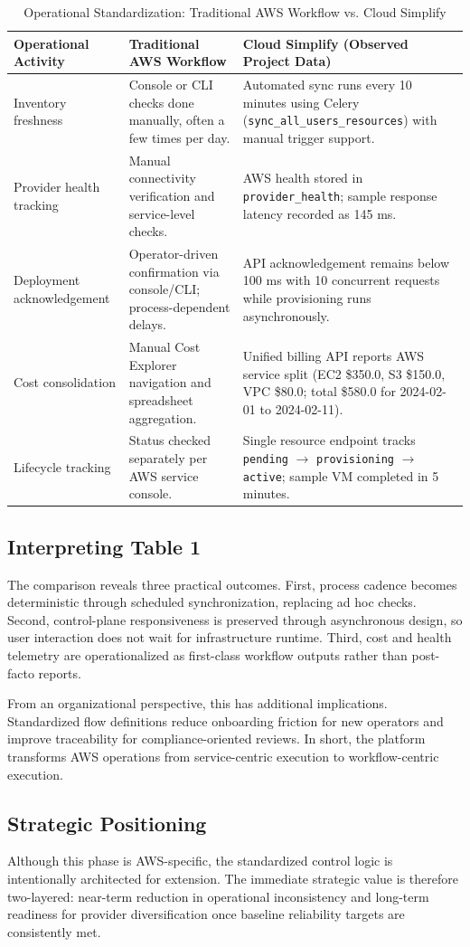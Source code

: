 \begin{table}[h]
\centering
\caption{Operational Standardization: Traditional AWS Workflow vs. Cloud Simplify}
\label{tab:time_comp}
\begin{tabular}{|p{3.2cm}|p{4.2cm}|p{5.1cm}|}
\hline
\textbf{Operational Activity} & \textbf{Traditional AWS Workflow} & \textbf{Cloud Simplify (Observed Project Data)} \\ \hline
Inventory freshness & Console or CLI checks done manually, often a few times per day. & Automated sync runs every 10 minutes using Celery (\texttt{sync\_all\_users\_resources}) with manual trigger support. \\ \hline
Provider health tracking & Manual connectivity verification and service-level checks. & AWS health stored in \texttt{provider\_health}; sample response latency recorded as 145 ms. \\ \hline
Deployment acknowledgement & Operator-driven confirmation via console/CLI; process-dependent delays. & API acknowledgement remains below 100 ms with 10 concurrent requests while provisioning runs asynchronously. \\ \hline
Cost consolidation & Manual Cost Explorer navigation and spreadsheet aggregation. & Unified billing API reports AWS service split (EC2 \$350.0, S3 \$150.0, VPC \$80.0; total \$580.0 for 2024-02-01 to 2024-02-11). \\ \hline
Lifecycle tracking & Status checked separately per AWS service console. & Single resource endpoint tracks \texttt{pending} $\rightarrow$ \texttt{provisioning} $\rightarrow$ \texttt{active}; sample VM completed in 5 minutes. \\ \hline
\end{tabular}
\end{table}

\subsection{Interpreting Table 1}
The comparison reveals three practical outcomes. First, process cadence becomes deterministic through scheduled synchronization, replacing ad hoc checks. Second, control-plane responsiveness is preserved through asynchronous design, so user interaction does not wait for infrastructure runtime. Third, cost and health telemetry are operationalized as first-class workflow outputs rather than post-facto reports.

From an organizational perspective, this has additional implications. Standardized flow definitions reduce onboarding friction for new operators and improve traceability for compliance-oriented reviews. In short, the platform transforms AWS operations from service-centric execution to workflow-centric execution.

\subsection{Strategic Positioning}
Although this phase is AWS-specific, the standardized control logic is intentionally architected for extension. The immediate strategic value is therefore two-layered: near-term reduction in operational inconsistency and long-term readiness for provider diversification once baseline reliability targets are consistently met.
